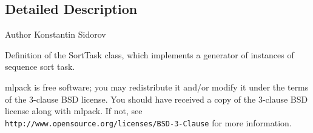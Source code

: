 \subsection{Detailed Description}
\begin{DoxyAuthor}{Author}
Konstantin Sidorov
\end{DoxyAuthor}
Definition of the Sort\+Task class, which implements a generator of instances of sequence sort task.

mlpack is free software; you may redistribute it and/or modify it under the terms of the 3-\/clause B\+SD license. You should have received a copy of the 3-\/clause B\+SD license along with mlpack. If not, see {\tt http\+://www.\+opensource.\+org/licenses/\+B\+S\+D-\/3-\/\+Clause} for more information. 